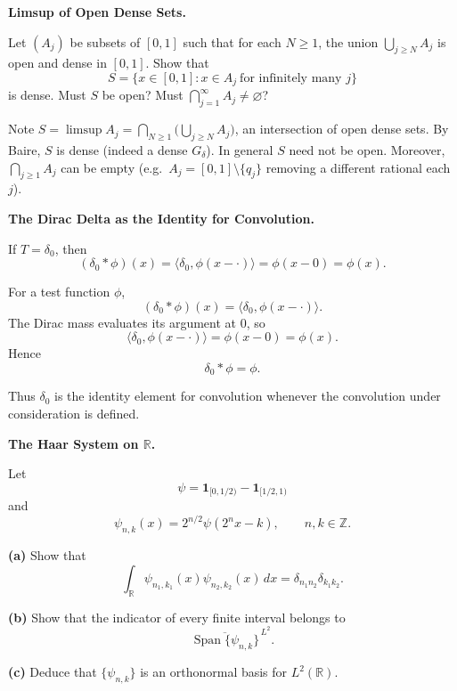 \begin{problem}[CP-II-0177]
\label{prob:cp-ii-0177}
\textbf{Limsup of Open Dense Sets.}

\hspace*{1.5em}Let $(A_j)$ be subsets of $[0,1]$ such that for each $N\ge1$, the union $\bigcup_{j\ge N}A_j$
is open and dense in $[0,1]$. Show that
\[
S=\{x\in[0,1]: x\in A_j\ \text{for infinitely many }j\}
\]
is dense. Must $S$ be open? Must $\bigcap_{j=1}^{\infty} A_j\neq\varnothing$?
\end{problem}

\begin{solution}
Note $S=\limsup A_j=\bigcap_{N\ge1}\big(\bigcup_{j\ge N}A_j\big)$, an intersection of open dense sets.
By Baire, $S$ is dense (indeed a dense $G_\delta$). In general $S$ need not be open.
Moreover, $\bigcap_{j\ge1}A_j$ can be empty (e.g.\ $A_j=[0,1]\setminus\{q_j\}$ removing a different rational each $j$).

\bigskip
\end{solution}

\begin{problem}[CP-II-0178]
\label{prob:cp-ii-0178}
\textbf{The Dirac Delta as the Identity for Convolution.}

\hspace*{1.5em}If $T=\delta_0$, then
	\[
	(\delta_0*\phi)(x)
	= \langle\delta_0,\phi(x-\cdot)\rangle
	= \phi(x-0) = \phi(x).
	\]
\end{problem}

\begin{solution}
For a test function \(\phi\),
\[
(\delta_0*\phi)(x)
=
\langle\delta_0,\phi(x-\cdot)\rangle.
\]
The Dirac mass evaluates its argument at \(0\), so
\[
\langle\delta_0,\phi(x-\cdot)\rangle
=
\phi(x-0)
=
\phi(x).
\]
Hence
\[
\boxed{\delta_0*\phi=\phi.}
\]

Thus \(\delta_0\) is the identity element for convolution whenever the convolution under
consideration is defined.
\end{solution}


\begin{problem}[CP-II-0179]
\label{prob:cp-ii-0179}
\textbf{The Haar System on \(\mathbb R\).}

\hspace*{1.5em}Let
\[
\psi
=
\mathbf 1_{[0,1/2)}
-
\mathbf 1_{[1/2,1)}
\]
and
\[
\psi_{n,k}(x)
=
2^{n/2}\psi(2^nx-k),
\qquad n,k\in\mathbb Z.
\]

\par\noindent\textbf{(a)}\quad
Show that
\[
\int_{\mathbb R}
\psi_{n_1,k_1}(x)\psi_{n_2,k_2}(x)\,dx
=
\delta_{n_1n_2}\delta_{k_1k_2}.
\]

\par\noindent\textbf{(b)}\quad
Show that the indicator of every finite interval belongs to
\[
\overline{\operatorname{Span}\{\psi_{n,k}\}}^{\,L^2}.
\]

\par\noindent\textbf{(c)}\quad
Deduce that \(\{\psi_{n,k}\}\) is an orthonormal basis for
\(L^2(\mathbb R)\).
\end{problem}

